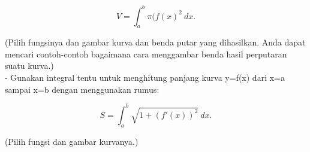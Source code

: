 \documentclass[a4paper,10pt]{article}
\begin{document}
\begin{eulernotebook}
\begin{eulercomment}
\begin{eulercomment}
\begin{eulercomment}
\end{eulercomment}
\begin{eulerformula}
\[
V = \int_a^b \pi (f(x)^2\ dx.
\]
\end{eulerformula}
\begin{eulercomment}
(Pilih fungsinya dan gambar kurva dan benda putar yang dihasilkan.
Anda dapat mencari contoh-contoh bagaimana cara menggambar benda hasil
perputaran suatu kurva.)\\
- Gunakan integral tentu untuk menghitung panjang kurva y=f(x) dari
x=a sampai x=b dengan menggunakan rumus:

\end{eulercomment}
\begin{eulerformula}
\[
S = \int_a^b \sqrt{1+(f'(x))^2} \ dx.
\]
\end{eulerformula}
\begin{eulercomment}
(Pilih fungsi dan gambar kurvanya.)


\end{eulercomment}
\end{eulercomment}
\end{eulercomment}
\end{eulernotebook}
\end{document}
